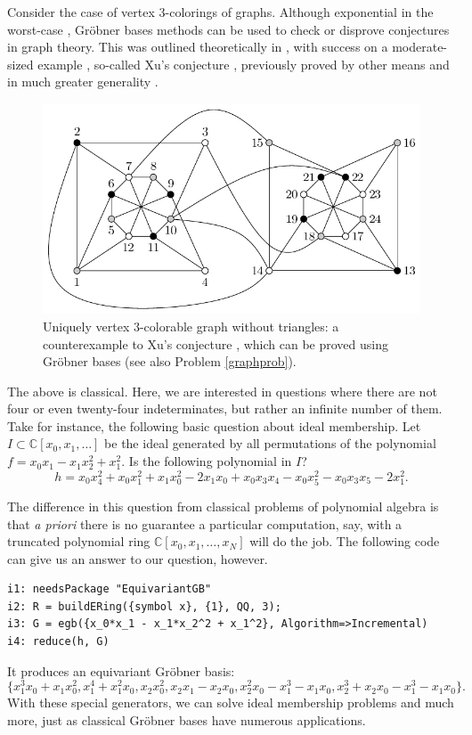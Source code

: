 Consider the case of vertex 3-colorings of graphs.  Although exponential in the worst-case \cite[pp. 400]{yap2000fundamental}, Gr\"obner bases methods can be used to check or disprove conjectures in graph theory.  This was outlined theoretically in \cite{bayer1982division}, with success on a moderate-sized example \cite{hillar2008algebraic}, so-called Xu's conjecture \cite{shaoji1990size}, previously proved by other means and in much greater generality \cite{akbari2001kr}.

\begin{figure}
\begin{center}
\includegraphics[width=.8 \linewidth]{akbarigraph.pdf}
\caption{Uniquely vertex 3-colorable graph without triangles: a counterexample \cite{akbari2001kr} to Xu's conjecture \cite{shaoji1990size}, which can be proved using Gr\"obner bases \cite{hillar2008algebraic} (see also Problem \ref{graphprob}).}\label{graph}
\end{center}
\end{figure}
\fi

The above is classical.  Here, we are interested  in questions where there are not four or even twenty-four indeterminates, but rather an infinite number of them.  Take for instance, the following basic question about ideal membership.  Let $I \subset \mathbb C[x_0,x_1,\ldots]$ be the ideal generated by all permutations of the polynomial $f = x_0 x_1 - x_1 x_2^2 +x_1^2$.  Is the following polynomial in $I$?
\[ h = x_0 x_4^2 + x_0 x_1^2  +x_1 x_0^2 - 2 x_1 x_0 + x_0 x_3 x_4 - x_0 x_5^2 - x_0 x_3 x_5 - 2 x_1^2.\]

The difference in this question from classical problems of polynomial algebra is that \textit{a priori} there is no guarantee a particular computation, say, with a truncated polynomial ring $\mathbb C[x_0,x_1,\ldots, x_N]$ will do the job.  The following code can give us an answer to our question, however.
\begin{M2}
\begin{verbatim}
i1: needsPackage "EquivariantGB"
i2: R = buildERing({symbol x}, {1}, QQ, 3);
i3: G = egb({x_0*x_1 - x_1*x_2^2 + x_1^2}, Algorithm=>Incremental)
i4: reduce(h, G)
\end{verbatim}
\end{M2}  
It produces an equivariant Gr\"obner basis: $$\{x_1^3 x_0+x_1 x_0^2, x_1^4+x_1^2 x_0, x_2 x_0^2, x_2 x_1-x_2 x_0, x_2^2 x_0-x_1^3-x_1 x_0, x_2^3+x_2 x_0-x_1^3-x_1 x_0\}.$$  
With these special generators, we can solve ideal membership problems and much more, just as classical Gr\"obner bases have numerous applications.  %


